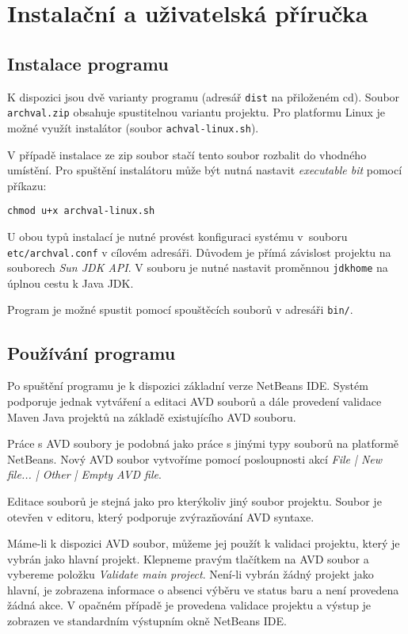 \chapter{Instalační a uživatelská příručka}

\section{Instalace programu}

K dispozici jsou dvě varianty programu (adresář \verb+dist+ na přiloženém cd). Soubor \verb+archval.zip+ obsahuje spustitelnou variantu projektu. Pro platformu Linux je možné využít instalátor (soubor \verb+achval-linux.sh+).

V případě instalace ze zip soubor stačí tento soubor rozbalit do vhodného umístění. Pro spuštění instalátoru může být nutná nastavit \emph{executable bit} pomocí příkazu:

\begin{verbatim}
chmod u+x archval-linux.sh
\end{verbatim}

U obou typů instalací je nutné provést konfiguraci systému v~souboru \verb+etc/archval.conf+ v cílovém adresáři. Důvodem je přímá závislost projektu na souborech \emph{Sun JDK API}. V souboru je nutné nastavit proměnnou \verb+jdkhome+ na úplnou cestu k Java JDK.

Program je možné spustit pomocí spouštěcích souborů v adresáři \verb+bin/+.

\section{Používání programu}
Po spuštění programu je k dispozici základní verze NetBeans IDE. Systém podporuje jednak vytváření a editaci AVD souborů a dále provedení validace Maven Java projektů na základě existujícího AVD souboru.

Práce s AVD soubory je podobná jako práce s jinými typy souborů na platformě NetBeans. Nový AVD soubor vytvoříme pomocí posloupnosti akcí \emph{File | New file... | Other | Empty AVD file}.

Editace souborů je stejná jako pro kterýkoliv jiný soubor projektu. Soubor je otevřen v editoru, který podporuje zvýrazňování AVD syntaxe.

Máme-li k dispozici AVD soubor, můžeme jej použít k validaci projektu, který je vybrán jako hlavní projekt. Klepneme pravým tlačítkem na AVD soubor a vybereme položku \emph{Validate main project}. Není-li vybrán žádný projekt jako hlavní, je zobrazena informace o absenci výběru ve status baru a není provedena žádná akce. V opačném případě je provedena validace projektu a výstup je zobrazen ve standardním výstupním okně NetBeans IDE.

